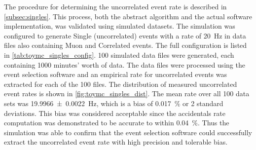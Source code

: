 The procedure for determining the uncorrelated event rate
is described in \cref{subsec:singles}.
This process, both the abstract algorithm and the actual software implementation,
was validated using simulated datasets.
The simulation was configured to generate Single (uncorrelated) events
with a rate of \SI{20}{\Hz}
in data files also containing Muon and Correlated events.
The full configuration is listed in \cref{tab:toymc_singles_config}.
100 simulated data files were generated,
each containing 1000 minutes' worth of data.
The data files were processed using the event selection software
and an empirical rate for uncorrelated events was extracted
for each of the 100 files.
The distribution of measured uncorrelated event rates
is shown in \cref{fig:toymc_singles_dist}.
The mean rate over all 100 data sets
was \SI{19.9966+-0.0022}{\Hz},
which is a bias of \SI{0.017}{\percent} or 2 standard deviations.
This bias was considered acceptable
since the accidentals rate computation
was demonstrated to be accurate to within \SI{0.04}{\percent}.
Thus the simulation was able to confirm that
the event selection software could successfully extract
the uncorrelated event rate with high precision and tolerable bias.


